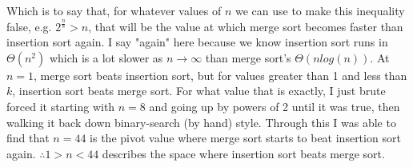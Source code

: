 \documentclass{article}
\begin{document}
Which is to say that, for whatever values of $n$ we can use to make this inequality false, e.g. $2^{\frac{n}{8}} > n$, that will be the value at which merge sort becomes faster than insertion sort again. I say "again" here because we know insertion sort runs in $\Theta(n^2)$ which is a lot slower as $n \to \infty$ than merge sort's $\Theta(nlog(n))$. At $n = 1$, merge sort beats insertion sort, but for values greater than 1 and less than $k$, insertion sort beats merge sort. For what value that is exactly, I just brute forced it starting with $n = 8$ and going up by powers of 2 until it was true, then walking it back down binary-search (by hand) style. Through this I was able to find that $n = 44$ is the pivot value where merge sort starts to beat insertion sort again. $\therefore 1 > n < 44$ describes the space where insertion sort beats merge sort.

\newpage
 

\end{document}
